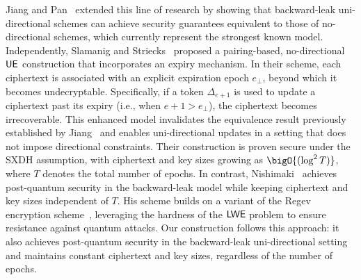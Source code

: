 \documentclass{fundam}
\begin{document}
Jiang and Pan~\cite{jiang2023backward} extended this line of research by showing that backward-leak uni-directional schemes can achieve security guarantees equivalent to those of no-directional schemes, which currently represent the strongest known model. Independently, Slamanig and Striecks~\cite{SS21} proposed a pairing-based, no-directional $\mathsf{UE}$ construction that incorporates an expiry mechanism. In their scheme, each ciphertext is associated with an explicit expiration epoch $e_\perp$, beyond which it becomes undecryptable. Specifically, if a token $\Delta_{e+1}$ is used to update a ciphertext past its expiry (i.e., when $e + 1 > e_\perp$), the ciphertext becomes irrecoverable. This enhanced model invalidates the equivalence result previously established by Jiang~\cite{jiang2020} and enables uni-directional updates in a setting that does not impose directional constraints. Their construction is proven secure under the SXDH assumption, with ciphertext and key sizes growing as $\bigO{(\log^2 T)}$, where $T$ denotes the total number of epochs. In contrast, Nishimaki~\cite{nishimaki2022direction} achieves post-quantum security in the backward-leak model while keeping ciphertext and key sizes independent of $T$. His scheme builds on a variant of the Regev encryption scheme~\cite{regev2009lattices}, leveraging the hardness of the $\mathsf{LWE}$ problem to ensure resistance against quantum attacks. Our construction follows this approach: it also achieves post-quantum security in the backward-leak uni-directional setting and maintains constant ciphertext and key sizes, regardless of the number of epochs.




\end{document}
